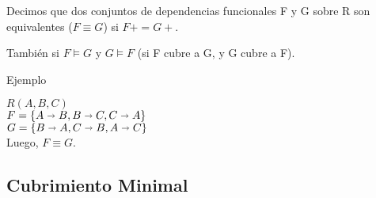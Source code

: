 \documentclass[10pt, a4paper,english,spanish]{article}
\newcommand{\imp}{\shortrightarrow}
\begin{document}
Decimos que dos conjuntos de dependencias funcionales F y G sobre R son equivalentes
($F \equiv G$) si $F+ = G+$.

Tambi\'en si $F \vDash G$ y $G \vDash F$ (si F cubre a G, y G cubre a F).

Ejemplo \label{ej:conjuntoDependencias}

$R(A,B,C)$\\
$F=\{A\imp B, B \imp C, C\imp A\}$\\
$G=\{B\imp A, C \imp B, A\imp C\}$\\

Luego, $F\equiv G$.


\subsection{Cubrimiento Minimal}
\end{document}
